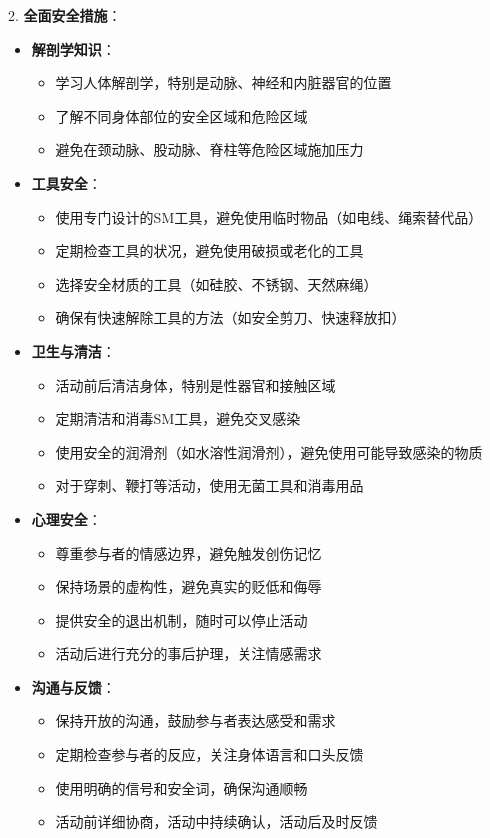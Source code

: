 \documentclass[12pt,UTF8]{ctexbook}
\begin{document}
2. \textbf{全面安全措施}：
  \begin{itemize}
  \item \textbf{解剖学知识}：
    \begin{itemize}
    \item 学习人体解剖学，特别是动脉、神经和内脏器官的位置
    \item 了解不同身体部位的安全区域和危险区域
    \item 避免在颈动脉、股动脉、脊柱等危险区域施加压力
    \end{itemize}
  \item \textbf{工具安全}：
    \begin{itemize}
    \item 使用专门设计的SM工具，避免使用临时物品（如电线、绳索替代品）
    \item 定期检查工具的状况，避免使用破损或老化的工具
    \item 选择安全材质的工具（如硅胶、不锈钢、天然麻绳）
    \item 确保有快速解除工具的方法（如安全剪刀、快速释放扣）
    \end{itemize}
  \item \textbf{卫生与清洁}：
    \begin{itemize}
    \item 活动前后清洁身体，特别是性器官和接触区域
    \item 定期清洁和消毒SM工具，避免交叉感染
    \item 使用安全的润滑剂（如水溶性润滑剂），避免使用可能导致感染的物质
    \item 对于穿刺、鞭打等活动，使用无菌工具和消毒用品
    \end{itemize}
  \item \textbf{心理安全}：
    \begin{itemize}
    \item 尊重参与者的情感边界，避免触发创伤记忆
    \item 保持场景的虚构性，避免真实的贬低和侮辱
    \item 提供安全的退出机制，随时可以停止活动
    \item 活动后进行充分的事后护理，关注情感需求
    \end{itemize}
  \item \textbf{沟通与反馈}：
    \begin{itemize}
    \item 保持开放的沟通，鼓励参与者表达感受和需求
    \item 定期检查参与者的反应，关注身体语言和口头反馈
    \item 使用明确的信号和安全词，确保沟通顺畅
    \item 活动前详细协商，活动中持续确认，活动后及时反馈
    \end{itemize}
  \end{itemize}
\end{document}
